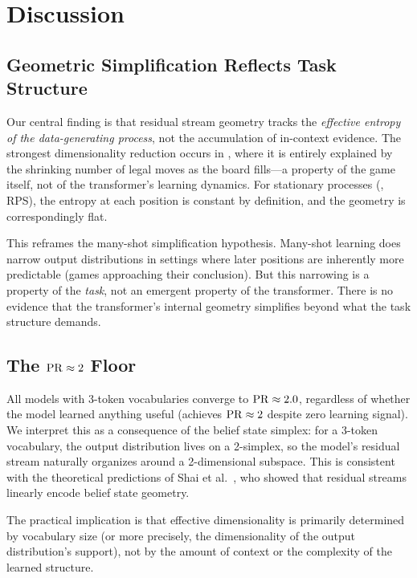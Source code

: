 \section{Discussion}
\label{sec:discussion}

\subsection{Geometric Simplification Reflects Task Structure}

Our central finding is that residual stream geometry tracks the \emph{effective entropy of the data-generating process}, not the accumulation of in-context evidence. The strongest dimensionality reduction occurs in \ttt, where it is entirely explained by the shrinking number of legal moves as the board fills---a property of the game itself, not of the transformer's learning dynamics. For stationary processes (\messthree, RPS), the entropy at each position is constant by definition, and the geometry is correspondingly flat.

This reframes the many-shot simplification hypothesis. Many-shot learning does narrow output distributions in settings where later positions are inherently more predictable (\eg games approaching their conclusion). But this narrowing is a property of the \emph{task}, not an emergent property of the transformer. There is no evidence that the transformer's internal geometry simplifies beyond what the task structure demands.

\subsection{The $\mathrm{PR} \approx 2$ Floor}

All models with 3-token vocabularies converge to $\mathrm{PR} \approx 2.0$, regardless of whether the model learned anything useful (\eg \rpsrandom achieves $\mathrm{PR} \approx 2$ despite zero learning signal). We interpret this as a consequence of the belief state simplex: for a 3-token vocabulary, the output distribution lives on a 2-simplex, so the model's residual stream naturally organizes around a 2-dimensional subspace. This is consistent with the theoretical predictions of Shai et al.~\cite{shai2024transformers}, who showed that residual streams linearly encode belief state geometry.

The practical implication is that effective dimensionality is primarily determined by vocabulary size (or more precisely, the dimensionality of the output distribution's support), not by the amount of context or the complexity of the learned structure.

